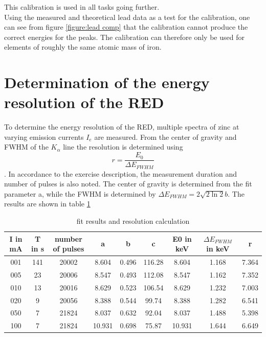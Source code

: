 This calibration is used in all tasks going further. \\Using the measured and theoretical lead data as a test for the calibration, one can see from figure \ref{figure:lead comp} that the calibration cannot produce the correct energies for the peaks. The calibration can therefore only be used for elements of roughly the same atomic mass of iron. 


\section{Determination of the energy resolution of the RED}
To determine the energy resolution of the RED, multiple spectra of zinc at varying emission currents $I_e$ are measured. From the center of gravity and FWHM of the $K_\alpha$ line the resolution is determined using 
$$r = \frac{E_0}{\Delta E_{FWHM}}$$. In accordance to the exercise description, the measurement duration and number of pulses is also noted. 
The center of gravity is determined from the fit parameter a, while the FWHM is determined by $\Delta E_{FWHM} = 2\sqrt{2\ln{2}}b$.
The results are shown in table \ref{tab:maxZNFIT}
\begin{table}[H]
    \centering
    \caption{fit results and resolution calculation}
    \begin{tabular}{ccccccccc}
    I in mA & T in s & number of pulses& a & b & c &E0 in keV & $\Delta E_{FWHM}$ in keV & r \\\hline
          001  & 141       &       20002       &  8.604 &   0.496  &  116.28 & 8.604  &  1.168      &     7.364  \\
          005  &  23      &        20006       &  8.547  &  0.493 &  112.08 &  8.547  &  1.162 & 7.352\\
          010  &  13    &         20016         & 8.629  &  0.523 &  106.54 &  8.629  &  1.232 & 7.003\\
          020  &   9    &           20056       & 8.388  &  0.544  & 99.74  &  8.388  &    1.282  & 6.541\\
          050  &   7    &            21824      & 8.037  &  0.632 &  92.04 &  8.037  &   1.488   & 5.398\\
          100  &   7    &             21824    &  10.931 &  0.698  & 75.87  &  10.931  &   1.644   & 6.649\\\hline
        
    \end{tabular}

    \label{tab:maxZNFIT}
\end{table}
